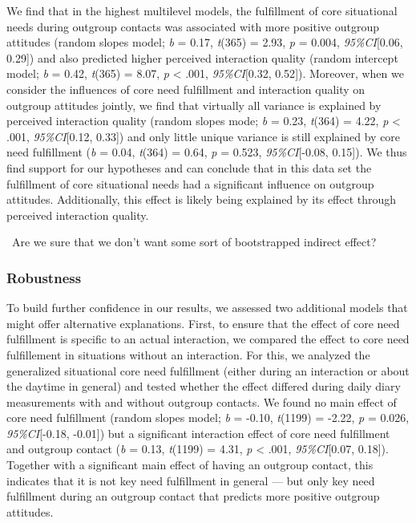 \documentclass[man, 12pt, a4paper]{apa7}
\theoremstyle{break}
\theoremstyle{plain}
\begin{document}
We find that in the highest multilevel models, the fulfillment of core
situational needs during outgroup contacts was associated with more
positive outgroup attitudes (random slopes model; \textit{b} = 0.17,
\textit{t}(365) = 2.93, \textit{p} = 0.004, \textit{95\%CI}{[}0.06,
0.29{]}) and also predicted higher perceived interaction quality (random
intercept model; \textit{b} = 0.42, \textit{t}(365) = 8.07, \textit{p}
\textless{} .001, \textit{95\%CI}{[}0.32, 0.52{]}). Moreover, when we
consider the influences of core need fulfillment and interaction quality
on outgroup attitudes jointly, we find that virtually all variance is
explained by perceived interaction quality (random slopes mode;
\textit{b} = 0.23, \textit{t}(364) = 4.22, \textit{p} \textless{} .001,
\textit{95\%CI}{[}0.12, 0.33{]}) and only little unique variance is
still explained by core need fulfillment (\textit{b} = 0.04,
\textit{t}(364) = 0.64, \textit{p} = 0.523, \textit{95\%CI}{[}-0.08,
0.15{]}). We thus find support for our hypotheses and can conclude that
in this data set the fulfillment of core situational needs had a
significant influence on outgroup attitudes. Additionally, this effect
is likely being explained by its effect through perceived interaction
quality.

\faQuestionCircle~Are we sure that we don't want some sort of
bootstrapped indirect effect?

\subsubsection{Robustness}

To build further confidence in our results, we assessed two additional
models that might offer alternative explanations. First, to ensure that
the effect of core need fulfillment is specific to an actual
interaction, we compared the effect to core need fulfillement in
situations without an interaction. For this, we analyzed the generalized
situational core need fulfillment (either during an interaction or about
the daytime in general) and tested whether the effect differed during
daily diary measurements with and without outgroup contacts. We found no
main effect of core need fulfillment (random slopes model; \textit{b} =
-0.10, \textit{t}(1199) = -2.22, \textit{p} = 0.026,
\textit{95\%CI}{[}-0.18, -0.01{]}) but a significant interaction effect
of core need fulfillment and outgroup contact (\textit{b} = 0.13,
\textit{t}(1199) = 4.31, \textit{p} \textless{} .001,
\textit{95\%CI}{[}0.07, 0.18{]}). Together with a significant main
effect of having an outgroup contact, this indicates that it is not key
need fulfillment in general --- but only key need fulfillment during an
outgroup contact that predicts more positive outgroup attitudes.
\end{document}
